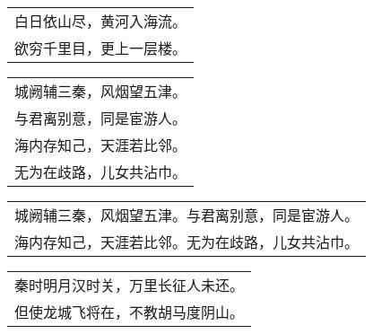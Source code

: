 \nopagebreak%
\nopagebreak%
\noindent\begin{minipage}{\linewidth}
  \vskip-3pt\begin{table}[H]
    \centering
    \begin{tabular}{@{}l@{}}
白日依山尽，黄河入海流。\\
欲穷千里目，更上一层楼。
    \end{tabular}
  \end{table}
\end{minipage}
\vspace{1cm}


\nopagebreak%
\nopagebreak%
\noindent\begin{minipage}{\linewidth}
  \vskip-3pt\begin{table}[H]
    \centering
    \begin{tabular}{@{}l@{}}
城阙辅三秦，风烟望五津。\\
与君离别意，同是宦游人。\\
海内存知己，天涯若比邻。\\
无为在歧路，儿女共沾巾。
    \end{tabular}
  \end{table}
\end{minipage}
\vspace{1cm}


\nopagebreak%
\nopagebreak%
\noindent\begin{minipage}{\linewidth}
  \vskip-3pt\begin{table}[H]
    \centering
    \begin{tabular}{@{}l@{}}
城阙辅三秦，风烟望五津。与君离别意，同是宦游人。\\
海内存知己，天涯若比邻。无为在歧路，儿女共沾巾。
    \end{tabular}
  \end{table}
\end{minipage}
\vspace{1cm}


\nopagebreak%
\nopagebreak%
\noindent\begin{minipage}{\linewidth}
  \vskip-3pt\begin{table}[H]
    \centering
    \begin{tabular}{@{}l@{}}
秦时明月汉时关，万里长征人未还。\\
但使龙城飞将在，不教胡马度阴山。
    \end{tabular}
  \end{table}
\end{minipage}
\vspace{1cm}



